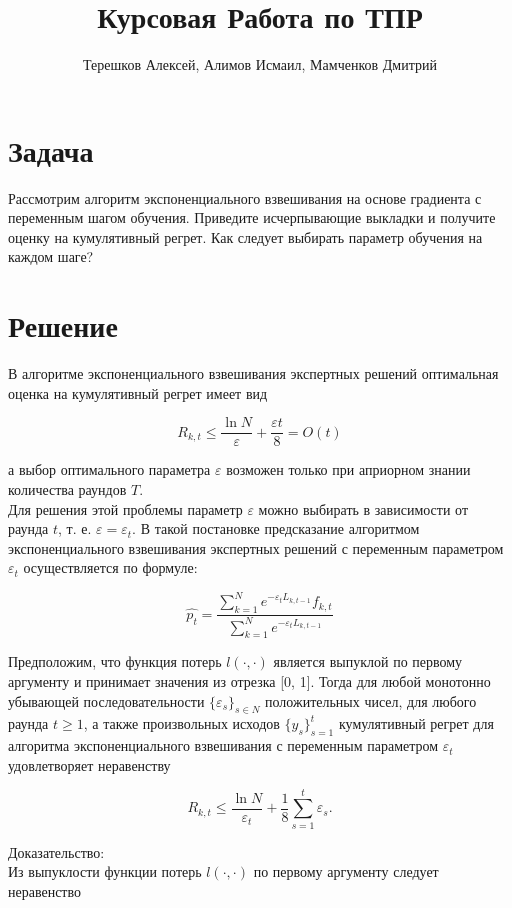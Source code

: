 \documentclass{article}
\title{Курсовая Работа по ТПР}
\author{Терешков Алексей, Алимов Исмаил, Мамченков Дмитрий}
\date{}
\begin{document}
\maketitle

\section{Задача}
Рассмотрим алгоритм экспоненциального взвешивания на основе градиента с переменным шагом обучения. Приведите исчерпывающие выкладки и получите оценку на кумулятивный регрет. Как следует выбирать параметр обучения на каждом шаге?

\section{Решение}
В алгоритме экспоненциального взвешивания экспертных решений оптимальная
оценка на кумулятивный регрет имеет вид

\[
R_{k,t} \le \frac{\ln{N}}{\varepsilon} + \frac{\varepsilon t}{8} = O(t) 
\]

а выбор оптимального параметра $\varepsilon$ возможен только при априорном знании количества раундов $T$. \\

Для решения этой проблемы параметр $\varepsilon$ можно выбирать в зависимости от раунда $t$, т. е. $\varepsilon = \varepsilon_t$. В такой постановке предсказание алгоритмом экспоненциального взвешивания экспертных решений с переменным параметром $\varepsilon_t$ осуществляется по формуле:

\[
\hat{p_t} = \frac{\sum^N_{k=1} e^{-\varepsilon_tL_{k,t-1}} f_{k,t} }{\sum^N_{k=1} e^{-\varepsilon_tL_{k,t-1}}} 
\]

Предположим, что функция потерь $l(\cdot, \cdot)$ является выпуклой по первому аргументу и принимает значения из отрезка [0, 1]. Тогда для любой монотонно убывающей последовательности $\{\varepsilon_s\}_{s\in N}$ положительных чисел, для любого раунда $t \ge 1$, а также произвольных исходов $\{y_s\}^t_{s=1}$ кумулятивный регрет для алгоритма экспоненциального взвешивания с переменным параметром $\varepsilon_t$ удовлетворяет неравенству

\[
R_{k,t} \le \frac{\ln{N}}{\varepsilon_t} + \frac{1}{8} \sum^t_{s=1} \varepsilon_s.
\]

Доказательство: \\

Из выпуклости функции потерь $l(\cdot, \cdot)$ по первому аргументу следует неравенство
\end{document}
